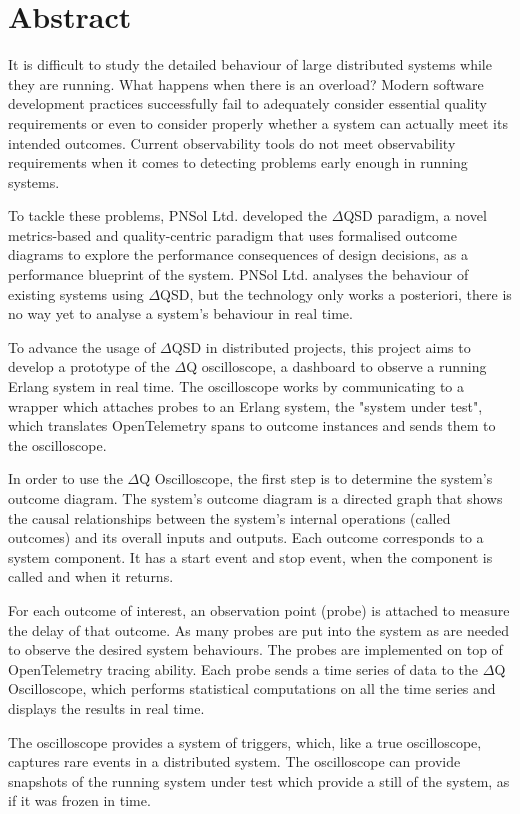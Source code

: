 \chapter*{Abstract}
    It is difficult to study the detailed behaviour of large distributed systems while they are running. What happens when there is an overload? Modern software development practices successfully fail to adequately consider essential quality requirements or even to consider properly whether a system can actually meet its intended outcomes. Current observability tools do not meet observability requirements when it comes to detecting problems early enough in running systems. 

    To tackle these problems, PNSol Ltd. developed the $\Delta$QSD paradigm, a novel metrics-based and quality-centric paradigm that uses formalised outcome diagrams to explore the performance consequences of design decisions, as a performance blueprint of the system. PNSol Ltd. analyses the behaviour of existing systems using $\Delta$QSD, but the technology only works a posteriori, there is no way yet to analyse a system’s behaviour in real time. 

    To advance the usage of $\Delta$QSD in distributed projects, this project aims to develop a prototype of the $\Delta$Q oscilloscope, a dashboard to observe a running Erlang system in real time. The oscilloscope works by communicating to a wrapper which attaches probes to an Erlang system, the "system under test", which translates OpenTelemetry spans to outcome instances and sends them to the oscilloscope. 

In order to use the $\Delta$Q Oscilloscope, the first step is to determine the system's outcome diagram. The system's outcome diagram is a directed graph that shows the causal relationships between the system's internal operations (called outcomes) and its overall inputs and outputs. Each outcome corresponds to a system component. It has a start event and stop event, when the component is called and when it returns.

For each outcome of interest, an observation point (probe) is attached to measure the delay of that outcome. As many probes are put into the system as are needed to observe the desired system behaviours. The probes are implemented on top of OpenTelemetry tracing ability. Each probe sends a time series of data to the $\Delta$Q Oscilloscope, which performs statistical computations on all the time series and displays the results in real time.

The oscilloscope provides a system of triggers, which, like a true oscilloscope, captures rare events in a distributed system. The oscilloscope can provide snapshots of the running system under test which provide a still of the system, as if it was frozen in time.
